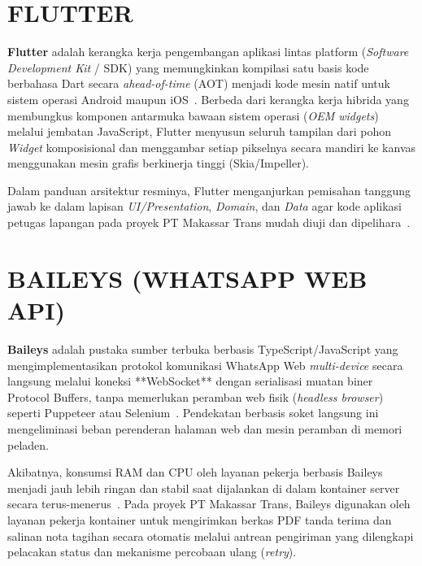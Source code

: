 \section{FLUTTER}

\textbf{Flutter} adalah kerangka kerja pengembangan aplikasi lintas platform (\textit{Software Development Kit} / SDK) yang memungkinkan kompilasi satu basis kode berbahasa Dart secara \textit{ahead-of-time} (AOT) menjadi kode mesin natif untuk sistem operasi Android maupun iOS~\cite{flutter_architecture}. Berbeda dari kerangka kerja hibrida yang membungkus komponen antarmuka bawaan sistem operasi (\textit{OEM widgets}) melalui jembatan JavaScript, Flutter menyusun seluruh tampilan dari pohon \textit{Widget} komposisional dan menggambar setiap pikselnya secara mandiri ke kanvas menggunakan mesin grafis berkinerja tinggi (Skia/Impeller).

Dalam panduan arsitektur resminya, Flutter menganjurkan pemisahan tanggung jawab ke dalam lapisan \textit{UI/Presentation}, \textit{Domain}, dan \textit{Data} agar kode aplikasi petugas lapangan pada proyek PT Makassar Trans mudah diuji dan dipelihara~\cite{flutter_architecture}.

\section{BAILEYS (WHATSAPP WEB API)}

\textbf{Baileys} adalah pustaka sumber terbuka berbasis TypeScript/JavaScript yang mengimplementasikan protokol komunikasi WhatsApp Web \textit{multi-device} secara langsung melalui koneksi **WebSocket** dengan serialisasi muatan biner Protocol Buffers, tanpa memerlukan peramban web fisik (\textit{headless browser}) seperti Puppeteer atau Selenium~\cite{baileys_whatsapp}. Pendekatan berbasis soket langsung ini mengeliminasi beban perenderan halaman web dan mesin peramban di memori peladen.

Akibatnya, konsumsi RAM dan CPU oleh layanan pekerja berbasis Baileys menjadi jauh lebih ringan dan stabil saat dijalankan di dalam kontainer server secara terus-menerus~\cite{baileys_whatsapp}. Pada proyek PT Makassar Trans, Baileys digunakan oleh layanan pekerja kontainer untuk mengirimkan berkas PDF tanda terima dan salinan nota tagihan secara otomatis melalui antrean pengiriman yang dilengkapi pelacakan status dan mekanisme percobaan ulang (\textit{retry}).

